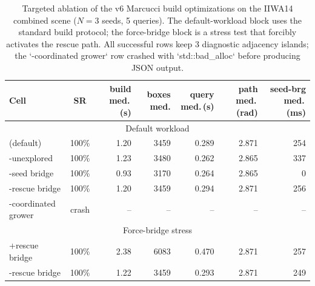 \begin{table}[t]
\centering
\caption{Targeted ablation of the v6 Marcucci build optimizations on the IIWA14 combined scene ($N=3$ seeds, 5 queries). The default-workload block uses the standard build protocol; the force-bridge block is a stress test that forcibly activates the rescue path. All successful rows keep 3 diagnostic adjacency islands; the `-coordinated grower` row crashed with `std::bad_alloc` before producing JSON output.}
\label{tab:v6_optim_ablation}
\begin{tabular}{lcrrrrr}
\toprule
Cell & SR & build med.\,(s) & boxes med. & query med.\,(s) & path med.\,(rad) & seed-brg med.\,(ms)\\
\midrule
\multicolumn{7}{c}{Default workload}\\
\midrule
(default) & 100\% & 1.20 & 3459 & 0.289 & 2.871 & 254\\
-unexplored & 100\% & 1.23 & 3480 & 0.262 & 2.865 & 337\\
-seed bridge & 100\% & 0.93 & 3170 & 0.264 & 2.865 & 0\\
-rescue bridge & 100\% & 1.20 & 3459 & 0.294 & 2.871 & 256\\
-coordinated grower & crash & -- & -- & -- & -- & --\\
\midrule
\multicolumn{7}{c}{Force-bridge stress}\\
\midrule
+rescue bridge & 100\% & 2.38 & 6083 & 0.470 & 2.871 & 257\\
-rescue bridge & 100\% & 1.22 & 3459 & 0.293 & 2.871 & 249\\
\bottomrule
\end{tabular}
\end{table}